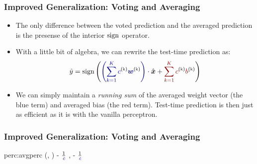 \documentclass[trans]{beamer}
\begin{document}
\begin{frame}
  \frametitle{Improved Generalization: Voting and Averaging}
\begin{itemize}
\item 
The only difference between the voted prediction and the averaged prediction is the presense of the interior $\textrm{sign}$
operator.
\item  With a little bit of algebra, we can rewrite the test-time
prediction as:
\begin{equation}
  \hat y = \sign \left(
    \dotp{\textcolor{darkblue}{\left(
        \sum_{k=1}^K c\kth \vw\kth 
        \right)}}{\hat\vx} +
      \textcolor{darkred}{\sum_{k=1}^K c\kth b\kth}
      \right)
\end{equation}
\item We can simply
maintain a \emph{running sum} of the averaged weight vector (the blue
term) and averaged bias (the red term).  Test-time prediction is then
just as efficient as it is with the vanilla perceptron.
\end{itemize}
\end{frame}
\begin{frame}
  \frametitle{Improved Generalization: Voting and Averaging}
\newalgorithm%
  {perc:avgperc}%
  {(, )}
  {
\ENDIF
{}
\ENDFOR
\ENDFOR
\RETURN \VAR{$\vw$} - $\frac 1 {\VAR{c}}$ , 
           - $\frac 1 {\VAR{c}}$ \VAR{$\beta$}
}
\end{frame}
\end{document}
